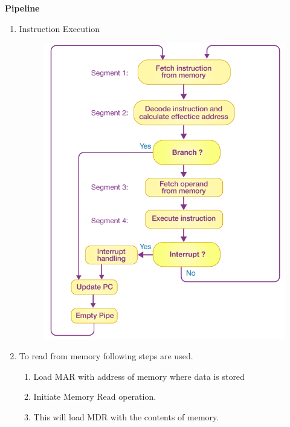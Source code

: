 
\centerline{\textbf{ \LARGE Pipeline }}

\begin{enumerate}
    \item Instruction Execution \\
        \begin{figure}[h]
            \centering   \includegraphics[scale=0.5]{./images/instruction-execution.png}
        \end{figure}

    \item To read from memory following steps are used.
    \begin{enumerate}
        \item Load MAR with address of memory where data is stored
        \item Initiate Memory Read operation.
        \item This will load MDR with the contents of memory.
    \end{enumerate}


\end{enumerate}
